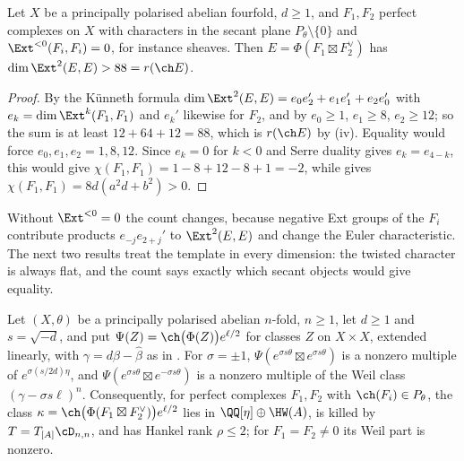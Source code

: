 \begin{proposition}[No Orlov product at $n=4$]\label{prop:orlovfour}
Let $X$ be a principally polarised abelian fourfold, $d\ge1$, and
$F_{1},F_{2}$ perfect complexes on $X$ with characters in the secant plane
$P_{\theta}\setminus\{0\}$ and $\Ext^{<0}(F_{i},F_{i})=0$, for instance
sheaves. Then $E=\Phi(F_{1}\boxtimes F_{2}^{\vee})$ has
$\dim\Ext^{2}(E,E)>88=r(\ch E)$.
\end{proposition}

\begin{proof}
By the K\"unneth formula $\dim\Ext^{2}(E,E)=e_{0}e_{2}'+e_{1}e_{1}'+e_{2}e_{0}'$
with $e_{k}=\dim\Ext^{k}(F_{1},F_{1})$ and $e_{k}'$ likewise for $F_{2}$, and by
 $e_{0}\ge1$, $e_{1}\ge8$, $e_{2}\ge12$; so the sum is
at least $12+64+12=88$, which is $r(\ch E)$ by (iv). Equality
would force $e_{0},e_{1},e_{2}=1,8,12$. Since $e_{k}=0$ for $k<0$ and Serre
duality gives $e_{k}=e_{4-k}$, this would give
$\chi(F_{1},F_{1})=1-8+12-8+1=-2$, while  gives
$\chi(F_{1},F_{1})=8d(a^{2}d+b^{2})>0$.
\end{proof}

Without $\Ext^{<0}=0$ the count changes, because negative Ext groups of the
$F_{i}$ contribute products $e_{-j}e_{2+j}'$ to $\Ext^{2}(E,E)$ and change the
Euler characteristic. The next two results treat the template in every
dimension: the twisted character is always flat, and the count says exactly
which secant objects would give equality.

\begin{proposition}\label{prop:flatall}
Let $(X,\theta)$ be a principally polarised abelian $n$-fold, $n\ge1$, let
$d\ge1$ and $s=\sqrt{-d}$, and put $\Psi(Z)=\ch\bigl(\Phi(Z)\bigr)e^{\ell/2}$
for classes $Z$ on $X\times X$, extended linearly, with $\gamma=d\beta-\widehat\beta$
as in . For $\sigma=\pm1$, $\Psi(e^{\sigma s\theta}\boxtimes
e^{\sigma s\theta})$ is a nonzero multiple of $e^{\sigma(s/2d)\eta}$, and
$\Psi(e^{\sigma s\theta}\boxtimes e^{-\sigma s\theta})$ is a nonzero multiple of the
Weil class $(\gamma-\sigma s\ell)^{n}$. Consequently, for perfect complexes
$F_{1},F_{2}$ with $\ch(F_{i})\in P_{\theta}$, the class
$\kappa=\ch\bigl(\Phi(F_{1}\boxtimes F_{2}^{\vee})\bigr)e^{\ell/2}$ lies in
$\QQ[\eta]\oplus\HW(A)$, is killed by $T=T_{[A]}\cD_{n,n}$, and has Hankel rank
$\rho\le2$; for $F_{1}=F_{2}\ne0$ its Weil part is nonzero.
\end{proposition}

